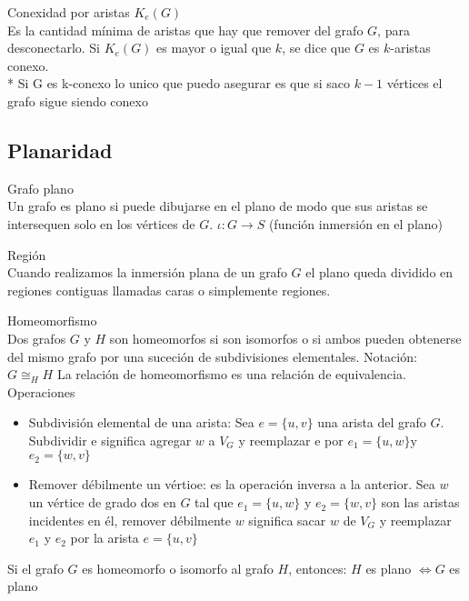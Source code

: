 \documentclass{article}
\begin{document}
\begin{defn}
Conexidad por aristas $K_{e}(G)$ \\ Es la cantidad mínima de aristas que hay que remover del grafo $G$, para desconectarlo. Si $K_{e}(G)$ es mayor o igual que $k$, se dice que $G$ es $k$-aristas conexo. \\*
Si G es k-conexo lo unico que puedo asegurar es que si saco $k-1$ vértices el grafo sigue siendo conexo
\end{defn}

\subsection{Planaridad}

\begin{defn}
Grafo plano \\ Un grafo es plano si puede dibujarse en el plano de modo que sus aristas se intersequen solo en los vértices de $G$. $\iota: G \rightarrow S$ (función inmersión en el plano)
\end{defn}

\begin{defn}
Región \\ Cuando realizamos la inmersión plana de un grafo $G$ el plano queda dividido en regiones contiguas llamadas caras o simplemente regiones.
\end{defn}

\begin{defn}
Homeomorfismo \\
Dos grafos $G$ y $H$ son homeomorfos si son isomorfos o si ambos pueden obtenerse del mismo grafo por una suceción de subdivisiones elementales. Notación: $G \cong_{H} H$
La relación de homeomorfismo es una relación de equivalencia. \\
Operaciones
\begin{itemize}
    \item Subdivisión elemental de una arista: Sea $e=\{u, v\}$ una arista del grafo $G .$ Subdividir e significa agregar $w$ a $V_{G}$ y reemplazar e por $e_{1}=\{u, w\} \mathrm{y}$ $e_{2}=\{w, v\}$
    \item Remover débilmente un vértioe: es la operación inversa a la anterior. Sea $w$ un vértice de grado dos en $G$ tal que $e_{1}=\{u, w\}$ y $e_{2}=\{w, v\}$ son las aristas incidentes en él, remover débilmente $w$ significa sacar $w$ de $V_{G}$ y reemplazar $e_{1}$ y $e_{2}$ por la arista $e=\{u, v\}$

\end{itemize}
Si el grafo $G$ es homeomorfo o isomorfo al grafo $H$, entonces:
$H$ es plano $\Leftrightarrow G$ es plano
\end{defn}
\end{document}
